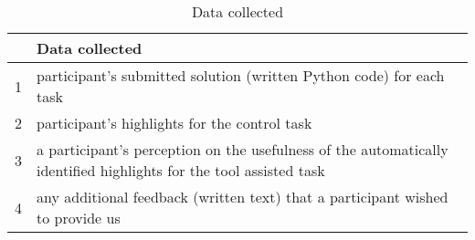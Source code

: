 \begin{table}
\caption{Data collected}
\begin{small}
\vspace{-1mm}  


\begin{threeparttable}    
\begin{tabular}{ll}
\hline    
\textbf{} & \textbf{Data collected}  \\ 
\hline
\hline
1 & 
\parbox[l][0.8cm][c]{11cm}{
    participant's submitted solution (written Python code) for each task
}  
\\
%
2 & 
\parbox[l][0.8cm][c]{11cm}{
     participant's highlights for the control task
}  \\
3 & 
\parbox[l][1cm][c]{11cm}{
    a participant's perception on the usefulness of the automatically identified highlights for the tool assisted task
}  \\
4 & 
\parbox[l][0.8cm][c]{11cm}{
    any additional feedback (written text) that a participant wished to provide us
}  \\
\hline
\end{tabular}
\end{threeparttable}    
\end{small}
\smallskip
\label{tbl:experiment-data}
\end{table}
    
